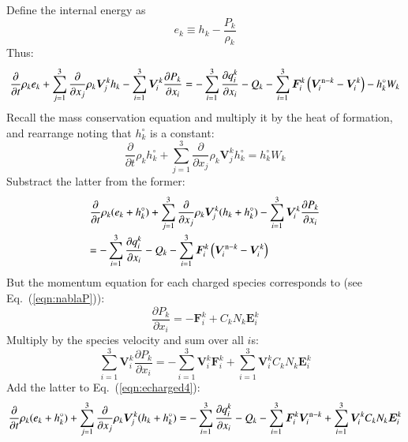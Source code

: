 \documentclass{warpdoc}
\newcommand{\alb}{\vspace{0.1cm}\\} %
\newcommand{\mfd}{\displaystyle}
\renewcommand{\vec}[1]{\bm{#1}}
\begin{document}
%  
Define the internal energy as
%
\begin{equation}
e_k \equiv h_k-\frac{P_k}{\rho_k}
\end{equation}
%
Thus:
%
\begin{equation}
 \frac{\partial }{\partial t}\rho_k e_k + \sum_{j=1}^3  \frac{\partial }{\partial x_j} \rho_k \vec{V}^k_j h_k 
- \sum_{i=1}^3 \vec{V}^k_i \frac{\partial P_k}{\partial x_i}
= 
-\sum_{i=1}^{3}\frac{\partial q_i^k}{\partial x_i}
- Q_{k}
-\sum_{i=1}^3 \vec{F}_i^k \left( \vec{V}_i^{{\rm n}-k}-\vec{V}_i^k \right)
- h_k^\circ W_k
\end{equation}
%  
Recall the mass conservation equation and multiply it by the heat of formation, and rearrange noting that $h_k^\circ$ is a constant:
%
\begin{equation}
 \frac{\partial }{\partial t}\rho_k h_k^\circ + \sum_{j=1}^3  \frac{\partial }{\partial x_j} \rho_k \vec{V}^k_j h_k^\circ 
=  h_k^\circ W_k
\end{equation}
%  
Substract the latter from the former:
%
\begin{equation}
\begin{array}{l}\mfd
 \frac{\partial }{\partial t}\rho_k (e_k+h_k^\circ) + \sum_{j=1}^3  \frac{\partial }{\partial x_j} \rho_k \vec{V}^k_j (h_k+h_k^\circ) 
- \sum_{i=1}^3 \vec{V}^k_i \frac{\partial P_k}{\partial x_i}
\alb\mfd= 
-\sum_{i=1}^{3}\frac{\partial q_i^k}{\partial x_i}
- Q_{k}
-\sum_{i=1}^3 \vec{F}_i^k \left( \vec{V}_i^{{\rm n}-k}-\vec{V}_i^k \right)
\end{array}
\label{eqn:echarged4}
\end{equation}
%  
But the momentum equation for each charged species corresponds to (see Eq.\ (\ref{eqn:nablaP})):
%
\begin{equation}
  \frac{\partial P_k}{\partial x_i} = -\vec{F}_i^k + C_k N_k \vec{E}^k_i
\end{equation}
%
Multiply by the species velocity and sum over all $i$s:
%
\begin{equation}
  \sum_{i=1}^3 \vec{V}_i^k \frac{\partial P_k}{\partial x_i} = -\sum_{i=1}^3 \vec{V}_i^k \vec{F}_i^k + \sum_{i=1}^3 \vec{V}_i^k C_k N_k \vec{E}^k_i
\end{equation}
%
Add the latter to Eq.\ (\ref{eqn:echarged4}):
%
\begin{equation}
 \frac{\partial }{\partial t}\rho_k (e_k+h_k^\circ) + \sum_{j=1}^3  \frac{\partial }{\partial x_j} \rho_k \vec{V}^k_j (h_k+h_k^\circ) 
= 
-\sum_{i=1}^{3}\frac{\partial q_i^k}{\partial x_i}
- Q_{k}
-\sum_{i=1}^3 \vec{F}_i^k \vec{V}_i^{{\rm n}-k} 
+\sum_{i=1}^3 \vec{V}_i^k C_k N_k \vec{E}^k_i
\end{equation}
\end{document}
